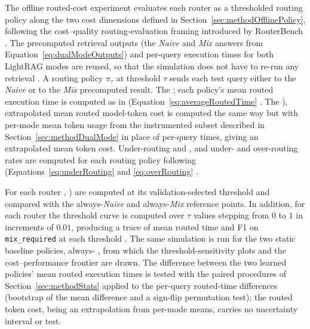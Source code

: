 \documentclass[english, bibtex]{kththesis}               %
\numberwithin{listing}{chapter}
\providecommand{\DIFaddtex}[1]{{\protect\color{blue} \sf #1}} %
\providecommand{\DIFdeltex}[1]{{\protect\color{red} \scriptsize #1}} %
\providecommand{\DIFaddbegin}{} %
\providecommand{\DIFaddend}{} %
\providecommand{\DIFdelbegin}{} %
\providecommand{\DIFdelend}{} %
\providecommand{\DIFadd}[1]{\texorpdfstring{\DIFaddtex{#1}}{#1}} %
\providecommand{\DIFdel}[1]{\texorpdfstring{\DIFdeltex{#1}}{}} %
\begin{document}
The offline routed-cost experiment evaluates each router as a thresholded routing policy along \DIFaddbegin \DIFadd{the }\DIFaddend two cost dimensions \DIFaddbegin \DIFadd{defined in Section~\ref{sec:methodOfflinePolicy}}\DIFaddend , following the cost--quality routing-evaluation framing introduced by RouterBench \cite{hu2024routerbench}. The precomputed retrieval outputs (the \emph{Naive} and \emph{Mix} answers from Equation~\ref{eq:dualModeOutputs}) and per-query execution times for both LightRAG modes are reused, so that the simulation does not have to re-run any retrieval\DIFdelbegin \DIFdel{. A routing policy $\pi_{\tau}$ at threshold $\tau$ sends each test query either to the \emph{Naive} or to the \emph{Mix} precomputed result. The }\DIFdelend \DIFaddbegin \DIFadd{; each policy's }\DIFaddend mean routed execution time \DIFdelbegin \DIFdel{is computed as in }\DIFdelend \DIFaddbegin \DIFadd{(}\DIFaddend Equation~\ref{eq:averageRoutedTime}\DIFdelbegin \DIFdel{. The }\DIFdelend \DIFaddbegin \DIFadd{), extrapolated }\DIFaddend mean routed model-token cost\DIFdelbegin \DIFdel{is computed the same way but with per-mode mean token usage from the instrumented subset described in Section~\ref{sec:methodDualMode} in place of per-query times, giving an extrapolated mean token cost. Under-routing and }\DIFdelend \DIFaddbegin \DIFadd{, and under- and }\DIFaddend over-routing rates \DIFdelbegin \DIFdel{are computed for each routing policy following }\DIFdelend \DIFaddbegin \DIFadd{(}\DIFaddend Equations~\ref{eq:underRouting} and \ref{eq:overRouting}\DIFdelbegin \DIFdel{.
}%

\DIFdel{For each router , }\DIFdelend \DIFaddbegin \DIFadd{) are computed at its validation-selected threshold and compared with the always-\emph{Naive} and always-\emph{Mix} reference points. In addition, for each router }\DIFaddend the threshold curve is computed over $\tau$ values stepping from $0$ to $1$ in increments of $0.01$, producing a trace of mean routed time and F1 on \texttt{mix\_required} at each threshold\DIFdelbegin \DIFdel{. The same simulation is run for the two static baseline policies, always-}\DIFdelend \DIFaddbegin \DIFadd{, from which the threshold-sensitivity plots and the cost--performance frontier are drawn. The difference between the two learned policies' mean routed execution times is tested with the paired procedures of Section~\ref{sec:methodStats} applied to the per-query routed-time differences (bootstrap of the mean difference and a sign-flip permutation test); the routed token cost, being an extrapolation from per-mode means, carries no uncertainty interval or test.
}
\end{document}
